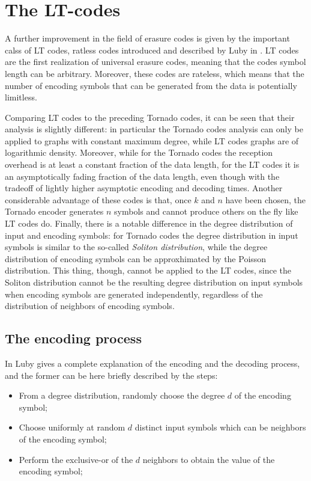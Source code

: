 \section{The LT-codes}
\label{sec:lt}
A further improvement in the field of erasure codes is given by the important calss of LT codes, ratless codes introduced and described by Luby in \cite{Luby}. LT codes are the first realization of universal erasure codes, meaning that the codes symbol length can be arbitrary. Moreover, these codes are rateless, which means that the number of encoding symbols that can be generated from the data is potentially limitless.

Comparing LT codes to the preceding Tornado codes, it can be seen that their analysis is slightly different: in particular the Tornado codes analysis can only be applied to graphs with constant maximum degree, while LT codes graphs are of logarithmic density. Moreover, while for the Tornado codes the reception overhead is at least a constant fraction of the data length, for the LT codes it is an asymptotically fading fraction of the data length, even though with the tradeoff of lightly higher asymptotic encoding and decoding times. Another considerable advantage of these codes is that, once $k$ and $n$ have been chosen, the Tornado encoder generates $n$ symbols and cannot produce others on the fly like LT codes do. Finally, there is a notable difference in the degree distribution of input and encoding symbols: for Tornado codes the degree distribution in input symbols is similar to the so-called \textit{Soliton distribution}, while the degree distribution of encoding symbols can be approxhimated by the Poisson distribution. This thing, though, cannot be applied to the LT codes, since the Soliton distribution cannot be the resulting degree distribution on input symbols when encoding symbols are generated independently, regardless of the distribution of neighbors of encoding symbols.
\cite{Luby}

\subsection{The encoding process}
In \cite{Luby} Luby gives a complete explanation of the encoding and the decoding process, and the former can be here briefly described by the steps:
\begin{itemize}
  \item From a degree distribution, randomly choose the degree $d$ of the encoding symbol;
  \item Choose uniformly at random $d$ distinct input symbols which can be neighbors of the encoding symbol;
  \item Perform the exclusive-or of the $d$ neighbors to obtain the value of the encoding symbol;
\end{itemize}

